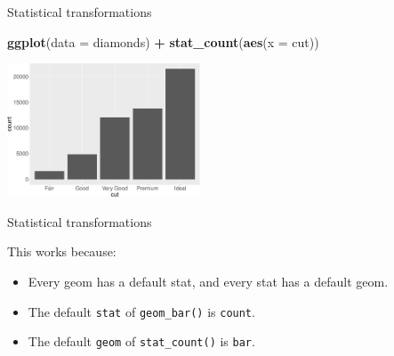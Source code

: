 \documentclass[ignorenonframetext,]{beamer}
\newenvironment{Shaded}{\begin{snugshade}}{\end{snugshade}}
\newcommand{\DataTypeTok}[1]{\textcolor[rgb]{0.13,0.29,0.53}{#1}}
\newcommand{\KeywordTok}[1]{\textcolor[rgb]{0.13,0.29,0.53}{\textbf{#1}}}
\newcommand{\NormalTok}[1]{#1}
\newcommand{\OperatorTok}[1]{\textcolor[rgb]{0.81,0.36,0.00}{\textbf{#1}}}
\newcommand{\StringTok}[1]{\textcolor[rgb]{0.31,0.60,0.02}{#1}}
\begin{document}
\begin{frame}[fragile]{Statistical transformations}
\protect\hypertarget{statistical-transformations-5}{}

\begin{Shaded}
\begin{Highlighting}[]
\KeywordTok{ggplot}\NormalTok{(}\DataTypeTok{data =}\NormalTok{ diamonds) }\OperatorTok{+}\StringTok{ }
\StringTok{  }\KeywordTok{stat_count}\NormalTok{(}\KeywordTok{aes}\NormalTok{(}\DataTypeTok{x =}\NormalTok{ cut))}
\end{Highlighting}
\end{Shaded}

\begin{center}\includegraphics[height=150px]{data-visualization_files/figure-beamer/unnamed-chunk-113-1} \end{center}

\end{frame}

\begin{frame}[fragile]{Statistical transformations}
\protect\hypertarget{statistical-transformations-6}{}

This works because:

\begin{itemize}
\item
  Every geom has a default stat, and every stat has a default geom.
\item
  The default \texttt{stat} of \texttt{geom\_bar()} is \texttt{count}.
\item
  The default \texttt{geom} of \texttt{stat\_count()} is \texttt{bar}.
\end{itemize}

\end{frame}
\end{document}

